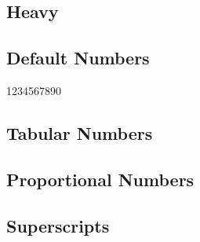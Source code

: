 \documentclass{article}
\begin{document}
\subsection*{Heavy}
{\interheavy\lipsum[11]}

\subsection*{Default Numbers}

1234567890

\subsection*{Tabular Numbers}
{}

\subsection*{Proportional Numbers}
{}

\subsection*{Superscripts}

\end{document}
